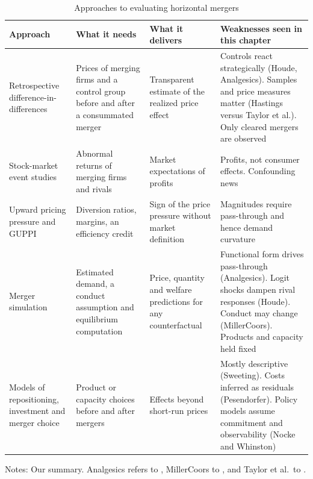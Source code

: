 \begin{table}[htbp]
\centering
\caption{Approaches to evaluating horizontal mergers}
\label{tab:11-approaches}
\begin{threeparttable}
\footnotesize
\begin{tabularx}{\textwidth}{@{}>{\raggedright\arraybackslash}p{2.3cm}>{\raggedright\arraybackslash}X%
>{\raggedright\arraybackslash}X>{\raggedright\arraybackslash}X@{}}
\toprule
Approach & What it needs & What it delivers & Weaknesses seen in this chapter \\
\midrule
Retrospective difference-in-differences & Prices of merging firms and a control group before and after a
consummated merger & Transparent estimate of the realized price effect & Controls react strategically (Houde,
Analgesics). Samples and price measures matter (Hastings versus Taylor et al.). Only cleared mergers are observed \\
\addlinespace
Stock-market event studies & Abnormal returns of merging firms and rivals & Market expectations of profits &
Profits, not consumer effects. Confounding news \\
\addlinespace
Upward pricing pressure and GUPPI & Diversion ratios, margins, an efficiency credit & Sign of the price pressure
without market definition & Magnitudes require pass-through and hence demand curvature \\
\addlinespace
Merger simulation & Estimated demand, a conduct assumption and equilibrium computation & Price, quantity and welfare
predictions for any counterfactual & Functional form drives pass-through (Analgesics). Logit shocks dampen rival
responses (Houde). Conduct may change (MillerCoors). Products and capacity held fixed \\
\addlinespace
Models of repositioning, investment and merger choice & Product or capacity choices before and after mergers & Effects
beyond short-run prices & Mostly descriptive (Sweeting). Costs inferred as residuals (Pesendorfer). Policy models
assume commitment and observability (Nocke and Whinston) \\
\bottomrule
\end{tabularx}
\begin{tablenotes}[flushleft]
\footnotesize
\item Notes: Our summary. Analgesics refers to \citet{BjornerstedtVerboven2016}, MillerCoors to
\citet{MillerWeinberg2017}, and Taylor et al.\ to \citet{TaylorKreisleZimmerman2010}.
\end{tablenotes}
\end{threeparttable}
\end{table}

